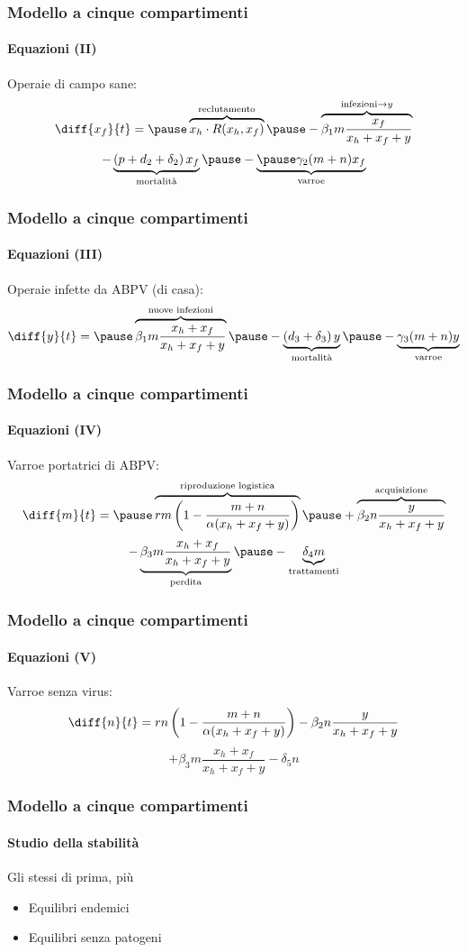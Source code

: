 \documentclass[]{beamer}
\begin{document}
\begin{frame}
    \frametitle{Modello a cinque compartimenti}
    \framesubtitle{Equazioni (II)}

    Operaie di campo sane:
    $$ \diff{x_f}{t} = \pause \overbrace{ x_h \cdot R(x_h, x_f) }^{\text{reclutamento}} %
    \pause - \overbrace{ \beta_1 m \frac{x_f}{x_h + x_f + y} }^{\text{infezioni} \to y}$$
    \pause
    $$ - \underbrace{\left( p + d_2 + \delta_2 \right) x_f}_{\text{mortalità}} %
    \pause - \underbrace{ \pause \gamma_2 (m+n) x_f }_{\text{varroe}}$$
\end{frame}

\begin{frame}
    \frametitle{Modello a cinque compartimenti}
    \framesubtitle{Equazioni (III)}

    Operaie infette da ABPV (di casa):
    $$\diff{y}{t} = \pause \overbrace{ \beta_1 m \frac{x_h + x_f}{x_h + x_f + y} }^{\text{nuove infezioni}} %
    \pause - \underbrace{ \left( d_3 + \delta_3 \right) y }_{\text{mortalità}} %
    \pause - \underbrace{ \gamma_3 (m+n) y }_{\text{varroe}}$$
\end{frame}

\begin{frame}
    \frametitle{Modello a cinque compartimenti}
    \framesubtitle{Equazioni (IV)}

    Varroe portatrici di ABPV:
    $$\diff{m}{t} = \pause \overbrace{ rm \left( 1 - \frac{m+n}{ \alpha (x_h + x_f + y) } \right) %
        }^{\text{riproduzione logistica}}%
        \pause + \overbrace{ \beta_2 n \frac{y}{x_h + x_f + y} }^{\text{acquisizione}}$$
    \pause
    $$- \underbrace{ \beta_3 m \frac{x_h + x_f}{x_h + x_f + y} }_{\text{perdita}} %
        \pause -\underbrace{ \delta_4 m }_{\text{trattamenti}} $$
\end{frame}

\begin{frame}
    \frametitle{Modello a cinque compartimenti}
    \framesubtitle{Equazioni (V)}

    Varroe senza virus:
    $$\diff{n}{t} = rn \left( 1 - \frac{m+n}{ \alpha (x_h + x_f + y) } \right) - \beta_2 n \frac{y}{x_h + x_f + y}$$
    $$+ \beta_3 m \frac{x_h + x_f}{x_h + x_f + y} - \delta_5 n$$
\end{frame}











\begin{frame}
    \frametitle{Modello a cinque compartimenti}
    \framesubtitle{Studio della stabilità}

    Gli stessi di prima, più
    \begin{itemize}
        \item Equilibri endemici
        \item Equilibri senza patogeni
    \end{itemize}
\end{frame}
\end{document}
